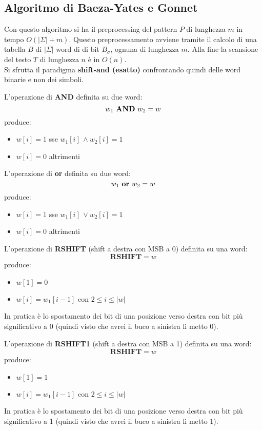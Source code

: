 \subsection{Algoritmo di Baeza-Yates e Gonnet}
Con questo algoritmo si ha il preprocessing del pattern $P$ di lunghezza $m$ in
tempo $O(|\Sigma|+m)$. Questo preprocessamento avviene tramite il calcolo di una
tabella $B$ di $|\Sigma|$ word di di bit $B_\sigma$, ognuna di lunghezza
$m$. Alla fine la scansione del testo $T$ di lunghezza $n$ è in $O(n)$.\\
Si sfrutta il paradigma \textbf{shift-and (esatto)} confrontando quindi delle
word binarie e non dei simboli.
\begin{definizione}
  L'operazione di \textbf{AND} definita su due word:
  \[w_1\mbox{ \textbf{AND} }w_2=w\]
  produce:
  \begin{itemize}
    \item $w[i]=1$ sse $w_1[i]\,\land w_2[i]=1$
    \item $w[i]=0$ altrimenti
  \end{itemize}
\end{definizione}
\begin{definizione}
  L'operazione di \textbf{or} definita su due word:
  \[w_1\mbox{ \textbf{or} }w_2=w\]
  produce:
  \begin{itemize}
    \item $w[i]=1$ sse $w_1[i]\,\lor w_2[i]=1$
    \item $w[i]=0$ altrimenti
  \end{itemize}
\end{definizione}
\begin{definizione}
  L'operazione di \textbf{RSHIFT} (shift a destra con MSB a 0) definita su una
  word: 
  \[\mathbf{RSHIFT}=w\]
  produce:
  \begin{itemize}
    \item $w[1]=0$
    \item $w[i]=w_1[i-1]$ con $2\leq i\leq |w|$
  \end{itemize}
  In pratica è lo spostamento dei bit di una posizione verso destra con bit più
  significativo a 0 (quindi visto che avrei il buco a sinistra lì metto 0).
\end{definizione}
\begin{definizione}
  L'operazione di \textbf{RSHIFT1} (shift a destra con MSB a 1) definita su una word:
  \[\mathbf{RSHIFT}=w\]
  produce:
  \begin{itemize}
    \item $w[1]=1$
    \item $w[i]=w_1[i-1]$ con $2\leq i\leq |w|$
  \end{itemize}
  In pratica è lo spostamento dei bit di una posizione verso destra con bit più
  significativo a 1 (quindi visto che avrei il buco a sinistra lì metto 1).
\end{definizione}
